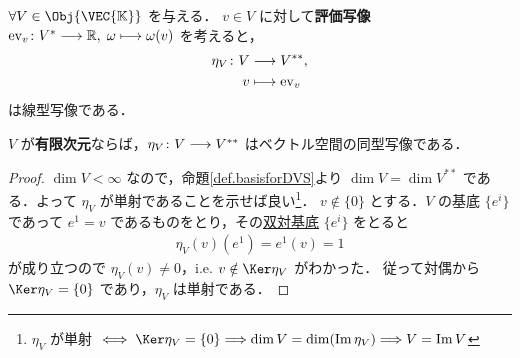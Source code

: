 \documentclass[geometry_main]{subfiles}
\begin{document}
$\forall V \in \Obj{\VEC{\mathbb{K}}}$ を与える．
$v \in V$ に対して\textbf{評価写像} $\mathrm{ev}_v \colon V^* \longrightarrow \mathbb{R},\; \omega \longmapsto \omega (v)$ を考えると，
\begin{align}
	\label{eq:dualspace-natural}
	\eta_V \colon V &\longrightarrow V^{**}, \\
	v &\longmapsto \mathrm{ev}_v
\end{align}
は線型写像である．

\begin{myprop}[label=prop:finvec-doubledual]{}
	$V$ が\textbf{有限次元}ならば，$\eta_V \colon V \longrightarrow V^{**}$ はベクトル空間の同型写像である．
\end{myprop}

\begin{proof}
	$\dim V < \infty$ なので，命題\ref{def.basisforDVS}より $\dim V = \dim V^{**}$ である．よって $\eta_V$ が単射であることを示せば良い\footnote{$\eta_V$ が単射 $\iff \Ker \eta_V = \{0\} \Longrightarrow \dim V = \dim (\Im \eta_V) \Longrightarrow V = \Im V$ }．
	$v \notin \{0\}$ とする．$V$ の基底 $\{e^i\}$ であって $e^1 = v$ であるものをとり，その\hyperref[def.basisforDVS]{双対基底} $\{e^i\}$ をとると
	\begin{align}
		\eta_V(v)(e^1) = e^1(v) = 1
	\end{align}
	が成り立つので $\eta_V(v) \neq 0$，i.e. $v \notin \Ker \eta_V$ がわかった．
	従って対偶から $\Ker \eta_V = \{0\}$ であり，$\eta_V$ は単射である．
\end{proof}
\end{document}
